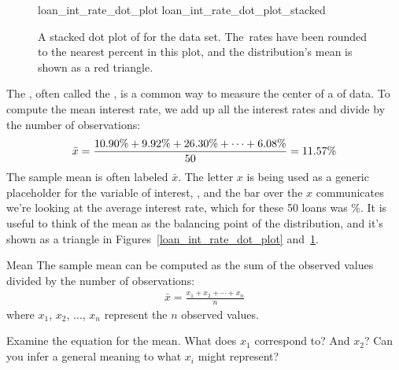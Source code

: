 \begin{figure}[h]
  \centering
      {loan_int_rate_dot_plot}
      {loan_int_rate_dot_plot_stacked}
  \caption{A stacked dot plot of
      for the  data set.
      The~rates have been rounded to the nearest
      percent in this plot, and the
      distribution's mean is shown as a red triangle.}
  \label{loan_int_rate_dot_plot_stacked}
\end{figure}

\D{\newpage}

The , often called the
, is a common way
to measure the center of a \mbox{} of data.
To compute the mean interest rate, we add up all the interest
rates and divide by the number of observations:
\begin{align*}
\bar{x}
    = \frac{\text{10.90\%} + \text{9.92\%} + \text{26.30\%} +
        \cdots + \text{6.08\%}}{50{}}
    = 11.57{}\%
\end{align*}
The sample mean is often labeled $\bar{x}$.
The letter $x$ is being used as a generic placeholder
for the variable of interest, ,
and the bar over the $x$ communicates we're looking at the
average interest rate, which for these 50 loans was \loanAvg{}\%.
It is useful to think of the mean as the balancing point
of the distribution, and it's shown as a triangle in Figures~\ref{loan_int_rate_dot_plot}
and~\ref{loan_int_rate_dot_plot_stacked}.

\begin{onebox}{Mean}%
The sample mean can be computed as the sum of the
observed values divided by the number of observations:
\begin{align*}
\bar{x} = \frac{x_1 + x_2 + \cdots + x_n}{n}
\end{align*}
where $x_1$, $x_2$, $\dots$, $x_n$ represent
the $n$ observed values.
\end{onebox}

\begin{exercisewrap}
\begin{nexercise}
Examine the equation for the mean.
What does $x_1$ correspond to? And $x_2$?
Can you infer a general meaning to what $x_i$
might represent?\footnotemark{}
\end{nexercise}
\end{exercisewrap}

